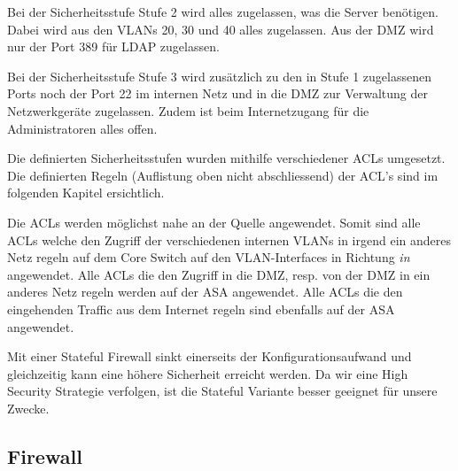 \documentclass[11pt,a4paper,parskip=half]{scrartcl}
\begin{document}
Bei der Sicherheitsstufe Stufe 2 wird alles zugelassen, was die Server benötigen. Dabei wird aus den VLANs 20, 30 und 40 alles zugelassen. Aus der DMZ wird nur der Port 389 für LDAP zugelassen.

Bei der Sicherheitsstufe Stufe 3 wird zusätzlich zu den in Stufe 1 zugelassenen Ports noch der Port 22 im internen Netz und in die DMZ zur Verwaltung der Netzwerkgeräte zugelassen. Zudem ist beim Internetzugang für die Administratoren alles offen.

Die definierten Sicherheitsstufen wurden mithilfe verschiedener ACLs umgesetzt. Die definierten Regeln (Auflistung oben nicht abschliessend) der ACL's sind im folgenden Kapitel ersichtlich.

Die ACLs werden möglichst nahe an der Quelle angewendet. Somit sind alle ACLs welche den Zugriff der verschiedenen internen VLANs in irgend ein anderes Netz regeln auf dem Core Switch auf den VLAN-Interfaces in Richtung \emph{in} angewendet. Alle ACLs die den Zugriff in die DMZ, resp. von der DMZ in ein anderes Netz regeln werden auf der ASA angewendet. Alle ACLs die den eingehenden Traffic aus dem Internet regeln sind ebenfalls auf der ASA angewendet.

Mit einer Stateful Firewall sinkt einerseits der Konfigurationsaufwand und gleichzeitig kann eine höhere Sicherheit erreicht werden. Da wir eine High Security Strategie verfolgen, ist die Stateful Variante besser geeignet für unsere Zwecke.

\subsection{Firewall}
\end{document}
